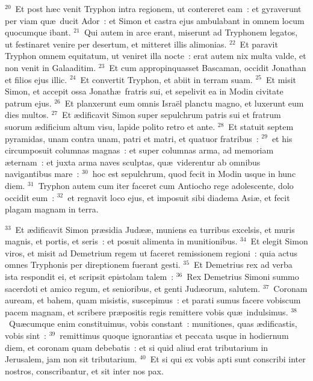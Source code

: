${}^{20}$~Et post h\ae c venit Tryphon intra regionem, ut contereret eam~: et gyraverunt per viam qu\ae\ ducit Ador~: et Simon et castra ejus ambulabant in omnem locum quocumque ibant.
${}^{21}$~Qui autem in arce erant, miserunt ad Tryphonem legatos, ut festinaret venire per desertum, et mitteret illis alimonias.
${}^{22}$~Et paravit Tryphon omnem equitatum, ut veniret illa nocte~: erat autem nix multa valde, et non venit in Galaaditim.
${}^{23}$~Et cum appropinquasset Bascaman, occidit Jonathan et filios ejus illic.
${}^{24}$~Et convertit Tryphon, et abiit in terram suam.
${}^{25}$~Et misit Simon, et accepit ossa Jonath\ae\ fratris sui, et sepelivit ea in Modin civitate patrum ejus.
${}^{26}$~Et planxerunt eum omnis Isra\"el planctu magno, et luxerunt eum dies multos.
${}^{27}$~Et \ae dificavit Simon super sepulchrum patris sui et fratrum suorum \ae dificium altum visu, lapide polito retro et ante.
${}^{28}$~Et statuit septem pyramidas, unam contra unam, patri et matri, et quatuor fratribus~:
${}^{29}$~et his circumposuit columnas magnas~: et super columnas arma, ad memoriam \ae ternam~: et juxta arma naves sculptas, qu\ae\ viderentur ab omnibus navigantibus mare~:
${}^{30}$~hoc est sepulchrum, quod fecit in Modin usque in hunc diem.
${}^{31}$~Tryphon autem cum iter faceret cum Antiocho rege adolescente, dolo occidit eum~:
${}^{32}$~et regnavit loco ejus, et imposuit sibi diadema Asi\ae , et fecit plagam magnam in terra.


${}^{33}$~Et \ae dificavit Simon pr\ae sidia Jud\ae \ae , muniens ea turribus excelsis, et muris magnis, et portis, et seris~: et posuit alimenta in munitionibus.
${}^{34}$~Et elegit Simon viros, et misit ad Demetrium regem ut faceret remissionem regioni~: quia actus omnes Tryphonis per direptionem fuerant gesti.
${}^{35}$~Et Demetrius rex ad verba ista respondit ei, et scripsit epistolam talem~:
${}^{36}$~Rex Demetrius Simoni summo sacerdoti et amico regum, et senioribus, et genti Jud\ae orum, salutem.
${}^{37}$~Coronam auream, et bahem, quam misistis, suscepimus~: et parati sumus facere vobiscum pacem magnam, et scribere pr\ae positis regis remittere vobis qu\ae\ indulsimus.
${}^{38}$~Qu\ae cumque enim constituimus, vobis constant~: munitiones, quas \ae dificastis, vobis sint~:
${}^{39}$~remittimus quoque ignorantias et peccata usque in hodiernum diem, et coronam quam debebatis~: et si quid aliud erat tributarium in Jerusalem, jam non sit tributarium.
${}^{40}$~Et si qui ex vobis apti sunt conscribi inter nostros, conscribantur, et sit inter nos pax.


